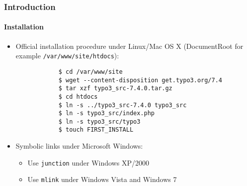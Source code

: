 \begin{frame}[fragile]
	\frametitle{Introduction}
	\framesubtitle{Installation}

	\begin{itemize}
		\item Official installation procedure under Linux/Mac OS X\newline
			(DocumentRoot for example \texttt{/var/www/site/htdocs}):
		\begin{lstlisting}
			$ cd /var/www/site
			$ wget --content-disposition get.typo3.org/7.4
			$ tar xzf typo3_src-7.4.0.tar.gz
			$ cd htdocs
			$ ln -s ../typo3_src-7.4.0 typo3_src
			$ ln -s typo3_src/index.php
			$ ln -s typo3_src/typo3
			$ touch FIRST_INSTALL
		\end{lstlisting}

		\item Symbolic links under Microsoft Windows:

			\begin{itemize}
				\item Use \texttt{junction} under Windows XP/2000
				\item Use \texttt{mlink} under Windows Vista and Windows 7
			\end{itemize}

	\end{itemize}
\end{frame}

